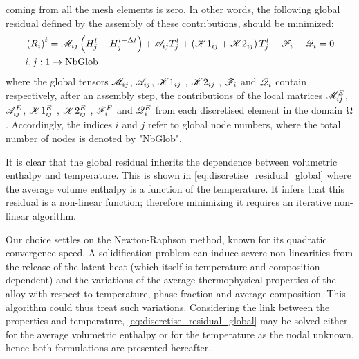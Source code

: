coming from all the mesh elements is zero. In other words, the following global residual defined by 
the assembly of these contributions, should be minimized: 
\begin{align}
\begin{split}
\label{eq:discretise_residual_global}
& \left( R_i \right)^t = \mathscr{M}_{ij} \left( H_j^t - H_j^{t-\Delta t} \right) + \mathscr{A}_{ij} T_j^t + \left( \mathscr{K}1_{ij} + \mathscr{K}2_{ij} \right)T_j^t -\mathscr{F}_{i} - \mathscr{Q}_{i}=0 \\
& i,j:1 \rightarrow \text{NbGlob}
\end{split}
\end{align}
where the global tensors $\mathscr{M}_{ij}$, $\mathscr{A}_{ij}$, $\mathscr{K}1_{ij}$ , $\mathscr{K}2_{ij}$ , $\mathscr{F}_{i}$ and $\mathscr{Q}_{i}$ contain respectively, after an assembly step, 
the contributions of the local matrices $\mathscr{M}_{ij}^E$, $\mathscr{A}_{ij}^E$, $\mathscr{K}1_{ij}^E$ , $\mathscr{K}2_{ij}^E$ , $\mathscr{F}_{i}^E$ and $\mathscr{Q}_{i}^E$ from each discretised 
element in the domain $\Omega$. Accordingly, the indices $i$ and $j$ refer to global node numbers, where the total number of nodes is 
denoted by "NbGlob". 

It is clear that the global residual inherits the dependence between volumetric enthalpy and temperature. 
This is shown in \cref{eq:discretise_residual_global} where the average volume enthalpy is a function of the temperature. It infers that this residual 
is a non-linear function; therefore minimizing it requires an iterative non-linear algorithm. 

Our choice settles on the Newton-Raphson method, known for its quadratic convergence speed. A solidification problem can induce severe non-linearities 
from the release of the latent heat (which itself is temperature and composition dependent) and the variations of the average thermophysical 
properties of the alloy with respect to temperature, phase fraction and average composition. This algorithm could thus treat such variations. 
Considering the link between the properties and temperature, \cref{eq:discretise_residual_global} may be solved either for the average volumetric enthalpy 
or for the temperature as the nodal unknown, hence both formulations are presented hereafter.


\let\iterplus\iter
\let\iter\iterminus

